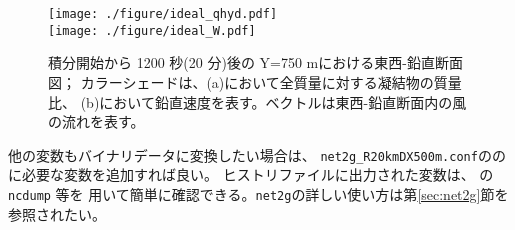 \begin{figure}[t]
\begin{center}
  \texttt{[image: ./figure/ideal\_qhyd.pdf]}\\
  \texttt{[image: ./figure/ideal\_W.pdf]}\\
  \caption{積分開始から 1200 秒(20 分)後の Y=750 mにおける東西-鉛直断面図；
           カラーシェードは、(a)において全質量に対する凝結物の質量比、
           (b)において鉛直速度を表す。ベクトルは東西-鉛直断面内の風の流れを表す。}
  \label{fig_ideal}
\end{center}
\end{figure}

他の変数もバイナリデータに変換したい場合は、
\verb|net2g_R20kmDX500m.conf|のの に必要な変数を追加すれば良い。
ヒストリファイルに出力された変数は、{\netcdf} の\verb|ncdump| 等を
用いて簡単に確認できる。\verb|net2g|の詳しい使い方は第\ref{sec:net2g}節を参照されたい。
